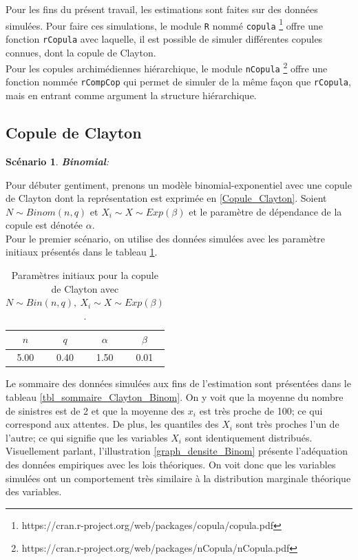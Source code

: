 \documentclass{article}
\newtheorem{Scenario}{Scénario}
\begin{document}
		Pour les fins du présent travail, les estimations sont faites sur des données simulées. Pour faire ces simulations, le module \texttt{R} nommé \texttt{copula} \footnote{https://cran.r-project.org/web/packages/copula/copula.pdf}
		offre une fonction \texttt{rCopula} avec laquelle, il est possible de simuler différentes copules connues, dont la copule de Clayton. \\
		
		Pour les copules archimédiennes hiérarchique, le module \texttt{nCopula} \footnote{https://cran.r-project.org/web/packages/nCopula/nCopula.pdf} offre une fonction nommée \texttt{rCompCop} qui permet de simuler de la même façon que \texttt{rCopula}, mais en entrant comme argument la structure hiérarchique.
	
	\subsection{Copule de Clayton}
		 \begin{Scenario}\label{scenario_Clayton_Binom}
			\textbf{Binomial}:
		 \end{Scenario}
	 
		 Pour débuter gentiment, prenons un modèle binomial-exponentiel avec une copule de Clayton dont la représentation est exprimée en \eqref{Copule_Clayton}.
		 Soient $N \sim Binom(n,q)$ et $X_i \sim X \sim Exp(\beta)$ et le paramètre de dépendance de la copule est dénotée $\alpha$.\\
	
		 Pour le premier scénario, on utilise des données simulées avec les paramètre initiaux présentés dans le tableau \ref{tbl_para_initiaux_Clayton_Binom}.
		 
		 \begin{table}[H]
		 	\centering
		 	\begin{tabular}{cccc}
		 		\hline
		 		$n$ & $q$ & $\alpha$ & $\beta$ \\ 
		 		\hline
		 		5.00 & 0.40 & 1.50 & 0.01 \\ 
		 		\hline
		 	\end{tabular}
	 	\caption{Paramètres initiaux pour la copule de Clayton avec $N \sim Bin(n, q),\ X_i \sim X \sim Exp(\beta)$.}
	 	\label{tbl_para_initiaux_Clayton_Binom}
		 \end{table}
		 
		Le sommaire des données simulées aux fins de l'estimation sont présentées dans le tableau \ref{tbl_sommaire_Clayton_Binom}. On y voit que la moyenne du nombre de sinistres est de 2 et que la moyenne des $x_i$ est très proche de 100; ce qui correspond aux attentes.
		De plus, les quantiles des $X_i$ sont très proches l'un de l'autre; ce qui signifie que les variables $X_i$ sont identiquement distribués. Visuellement parlant, l'illustration \ref{graph_densite_Binom} présente l'adéquation des données empiriques avec les lois théoriques. On voit donc que les variables simulées ont un comportement très similaire à la distribution marginale théorique des variables.\\
		
\end{document}
